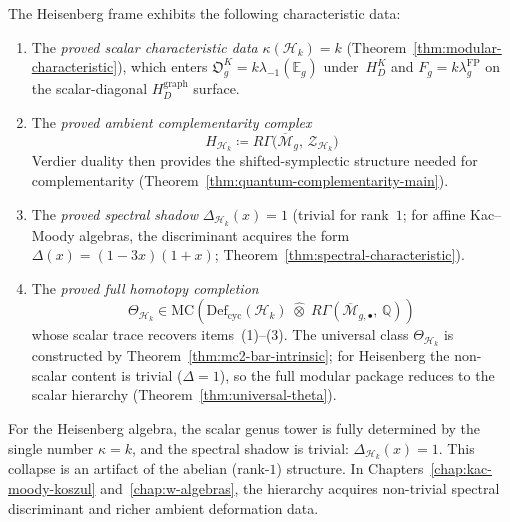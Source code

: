 \begin{definition}
\label{def:frame-modular-package}
The Heisenberg frame exhibits the following characteristic data:
\begin{enumerate}
\item The \emph{proved scalar characteristic data}
 $\kappa(\mathcal{H}_k) = k$
(Theorem~\ref{thm:modular-characteristic}), which enters
$\mathfrak O_g^K=k\lambda_{-1}(\mathbb E_g)$ under~$H_D^K$ and
$F_g=k\lambda_g^{\mathrm{FP}}$ on the scalar-diagonal
$H_D^{\mathrm{graph}}$ surface.
\item The \emph{proved ambient complementarity complex}
 \begin{equation}\label{eq:frame-ambient}
 H_{\mathcal{H}_k}
 \coloneqq R\Gamma\bigl(\overline{\mathcal{M}}_g,\,
 \mathcal{Z}_{\mathcal{H}_k}\bigr)
 \end{equation}
 Verdier duality then provides the shifted-symplectic
 structure needed for complementarity
 \textup{(}Theorem~\ref{thm:quantum-complementarity-main}\textup{)}.

\item The \emph{proved spectral shadow}
 $\Delta_{\mathcal{H}_k}(x) = 1$
 (trivial for rank~$1$; for affine Kac--Moody algebras, the
 discriminant acquires the form
 $\Delta(x) = (1-3x)(1+x)$;
 Theorem~\ref{thm:spectral-characteristic}).

\item The \emph{proved full homotopy completion}
 \begin{equation}\label{eq:frame-MC-class}
 \Theta_{\mathcal{H}_k} \in
 \mathrm{MC}\!\left(
 \mathrm{Def}_{\mathrm{cyc}}(\mathcal{H}_k)
 \;\widehat{\otimes}\;
 R\Gamma\!\left(\overline{\mathcal{M}}_{g,\bullet},\,
 \mathbb{Q}\right)
 \right)
 \end{equation}
 whose scalar trace recovers items~(1)--(3).
 The universal class $\Theta_{\mathcal{H}_k}$ is constructed
 by Theorem~\ref{thm:mc2-bar-intrinsic}; for Heisenberg
 the non-scalar content is trivial ($\Delta = 1$), so the
 full modular package reduces to the scalar hierarchy
 (Theorem~\ref{thm:universal-theta}).
\end{enumerate}
\end{definition}

For the Heisenberg algebra, the scalar genus tower is fully determined
by the single number $\kappa = k$, and the spectral shadow is trivial:
$\Delta_{\mathcal{H}_k}(x)=1$. This collapse is an artifact of the
abelian (rank-$1$) structure. In Chapters~\ref{chap:kac-moody-koszul}
and~\ref{chap:w-algebras}, the hierarchy acquires non-trivial spectral
discriminant and richer ambient deformation data.

